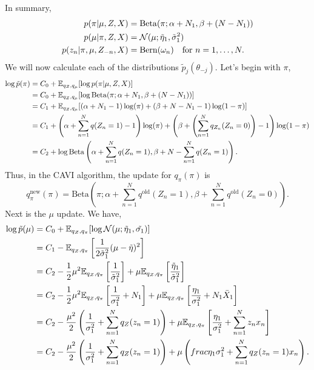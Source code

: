 In summary,
\begin{align}\label{eq:conditionals}
    p(\pi|\mu,Z,X)&=\mathrm{Beta}(\pi;\alpha+N_1,\beta+(N-N_1))\nonumber \\
    p(\mu|\pi,Z,X)&={\mathcal N}(\mu; \tilde{\eta}_1,\tilde{\sigma}_1^2)\nonumber \\
    p(z_n|\pi,\mu,Z_{-n},X)&=\mathrm{Bern}(\omega_{n}) \quad \text{for } n=1,\ldots,N.
\end{align}
We will now calculate each of the distributions $\tilde{p}_j(\theta_{-j})$. Let's begin with $\pi$,
\begin{align*}
    \log \tilde{p}(\pi)&=C_0 + {\mathbb E}_{q_Z,q_\mu}[\log p(\pi|\mu,Z,X)]\\
    &=C_0 + {\mathbb E}_{q_Z,q_\mu}[\log \mathrm{Beta}(\pi; \alpha+N_1,\beta+(N-N_1))]\\
    &=C_1 + {\mathbb E}_{q_Z,q_\mu}[(\alpha+N_1-1)\log(\pi)+(\beta + N-N_1 -1)\log(1-\pi)]\\
    &=C_1 + \left(\alpha + \sum_{n=1}^N q(Z_n=1) - 1\right)\log(\pi) + \left(\beta+\left(\sum_{n=1}^Nq_{Z_n}(Z_n=0)\right) -1\right)\log(1-\pi)\\
    &=C_2 + \log \mathrm{Beta}\left(\alpha+\sum_{n=1}^Nq(Z_n=1), \beta + N-\sum_{n=1}^N q(Z_n=1)\right).
\end{align*}
Thus, in the CAVI algorithm, the update for $q_\pi(\pi)$ is
\[q_\pi^{\text{new}}(\pi) = \mathrm{Beta}\left(\pi ; \alpha+\sum_{n=1}^Nq^{\text{old}}(Z_n=1), \beta + \sum_{n=1}^Nq^{\text{old}}(Z_n=0)\right). \]
Next is the $\mu$ update. We have,
\begin{align*}
    \log \tilde{p}(\mu)&=C_0 + {\mathbb E}_{q_Z,q_\pi}[\log {\mathcal N}(\mu; \tilde{\eta}_1,\tilde{\sigma_1})]\\
    &=C_1-{\mathbb E}_{q_Z,q_\pi}\left[\frac{1}{2\tilde{\sigma}_1^2}(\mu-\tilde{\eta})^2\right]\\
    &=C_2 -\frac{1}{2}\mu^2{\mathbb E}_{q_Z,q_\pi}\left[\frac{1}{\tilde{\sigma}_1^2}\right]+\mu{\mathbb E}_{q_Z,q_\pi}\left[\frac{\tilde{\eta}_1}{\tilde{\sigma}_1^2}\right]\\
    &=C_2 - \frac{1}{2}\mu^2{\mathbb E}_{q_Z,q_\pi}\left[\frac{1}{\sigma_1^2}+N_1\right]+\mu {\mathbb E}_{q_Z,q_\pi}\left[\frac{\eta_1}{\sigma_1^2}+N_1\bar{X}_1\right]\\
    &=C_2 - \frac{\mu^2}{2}\left(\frac{1}{\sigma_1^2} + \sum_{n=1}^N q_Z(z_n=1)\right) + \mu{\mathbb E}_{q_Z,q_\pi}\left[\frac{\eta_1}{\sigma_1^2}+\sum_{n=1}^Nz_nx_n\right]\\
    &=C_2 - \frac{\mu^2}{2}\left(\frac{1}{\sigma_1^2} + \sum_{n=1}^N q_Z(z_n=1)\right) + \mu\left(frac{\eta_1}{\sigma_1^2}+\sum_{n=1}^Nq_Z(z_n=1)x_n\right).
\end{align*}
